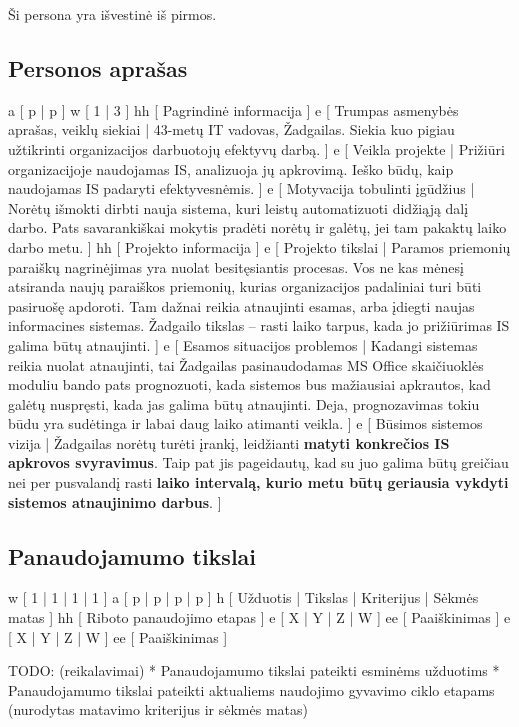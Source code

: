 ﻿Ši persona yra išvestinė iš pirmos.
\subsection{Personos aprašas}
\xtableu
{
  a [ p | p ]
  w [ 1 | 3 ]
  hh [ Pagrindinė informacija ]
  e [ Trumpas asmenybės aprašas, veiklų siekiai 
  | 
    43-metų IT vadovas, Žadgailas. Siekia kuo pigiau užtikrinti
    organizacijos darbuotojų efektyvų darbą.
  ]
  e [ Veikla projekte 
  | 
    Prižiūri organizacijoje naudojamas IS, analizuoja jų apkrovimą.
    Ieško būdų, kaip naudojamas IS padaryti efektyvesnėmis.
  ]
  e [ Motyvacija tobulinti įgūdžius 
  |
    Norėtų išmokti dirbti nauja sistema, kuri leistų automatizuoti
    didžiąją dalį darbo. Pats savarankiškai mokytis pradėti
    norėtų ir galėtų, jei tam pakaktų laiko darbo metu.
  ]
  hh [ Projekto informacija ]
  e [ Projekto tikslai 
  | 
    Paramos priemonių paraiškų nagrinėjimas yra nuolat
    besitęsiantis procesas. Vos ne kas mėnesį atsiranda naujų
    paraiškos priemonių, kurias organizacijos padaliniai turi būti
    pasiruošę apdoroti. Tam dažnai reikia atnaujinti esamas, arba
    įdiegti naujas informacines sistemas. Žadgailo tikslas – rasti
    laiko tarpus, kada jo prižiūrimas IS galima būtų atnaujinti.
  ]
  e [ Esamos situacijos problemos 
  | 
    Kadangi sistemas reikia nuolat atnaujinti, tai Žadgailas
    pasinaudodamas MS Office skaičiuoklės moduliu bando pats
    prognozuoti, kada sistemos bus mažiausiai apkrautos, kad galėtų
    nuspręsti, kada jas galima būtų atnaujinti. Deja, prognozavimas
    tokiu būdu yra sudėtinga ir labai daug laiko atimanti veikla.
  ]
  e [ Būsimos sistemos vizija 
  | 
    Žadgailas norėtų turėti įrankį, leidžianti \textbf{matyti konkrečios
    IS apkrovos svyravimus}. Taip pat jis pageidautų, kad su juo
    galima būtų greičiau nei per pusvalandį rasti \textbf{laiko intervalą,
    kurio metu būtų geriausia vykdyti sistemos atnaujinimo darbus}.
  ]
}

\subsection{Panaudojamumo tikslai}
\xtable
{
  w [ 1 | 1 | 1 | 1 ]
  a [ p | p | p | p ]
  h [ Užduotis | Tikslas | Kriterijus | Sėkmės matas ]
  hh [ Riboto panaudojimo etapas ]
  e [ X | Y | Z | W ]
  ee [ Paaiškinimas ]
  e [ X | Y | Z | W ]
  ee [ Paaiškinimas ]
}

TODO: (reikalavimai)
* Panaudojamumo tikslai pateikti esminėms užduotims
* Panaudojamumo tikslai pateikti aktualiems naudojimo gyvavimo ciklo etapams (nurodytas matavimo kriterijus ir sėkmės matas)
